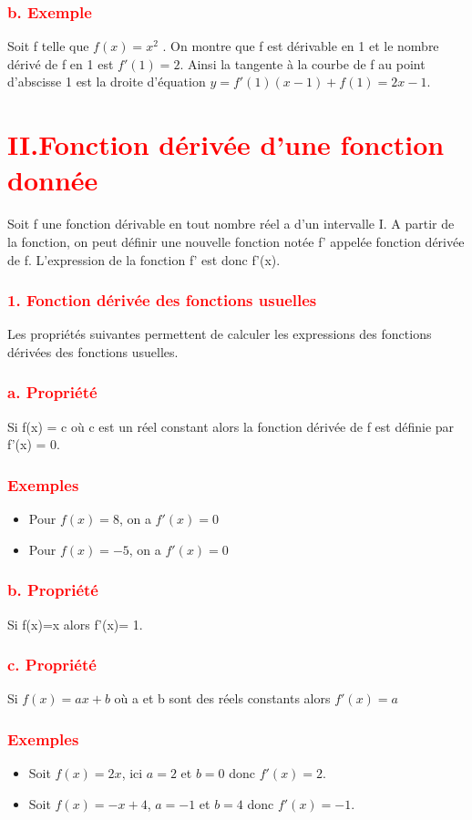 \documentclass[12pt]{article}
\begin{document}
\subsubsection*{\textcolor{red}{b. Exemple}}
Soit f telle que $f(x)= x^{2}$ . On montre que f est dérivable en 1 et le nombre dérivé de f en 1 est
$f'(1)=2$. Ainsi la tangente à la courbe de f au point d’abscisse 1 est la droite d’équation $y =f'(1)(x-1)+f(1) = 2x-1.$
\section*{\textcolor{red}{II.Fonction dérivée d’une fonction donnée}}
Soit f une fonction dérivable en tout nombre réel a d’un intervalle I. A partir de la fonction, on peut définir une nouvelle fonction notée f' appelée fonction dérivée de f. L’expression de la fonction f' est donc f'(x).
\subsubsection*{\textcolor{red}{1. Fonction dérivée des fonctions usuelles}}
Les propriétés suivantes permettent de calculer les expressions des fonctions dérivées des
fonctions usuelles.
\subsubsection*{\textcolor{red}{a. Propriété}}
Si f(x) = c où c est un réel constant alors la fonction dérivée de f est définie par f'(x) = 0.
\subsubsection*{\textcolor{red}{Exemples}}
\begin{itemize}
\item Pour $f(x) = 8$, on a $f'(x) = 0$
\item Pour $f(x)=-5$, on a $f'(x) = 0$
\end{itemize}
\subsubsection*{\textcolor{red}{b. Propriété}}
Si f(x)=x alors f'(x)= 1.
\subsubsection*{\textcolor{red}{c. Propriété}}
Si $f(x) = ax+b$ où a et b sont des réels constants alors $f'(x)=a$
\subsubsection*{\textcolor{red}{Exemples}}
\begin{itemize}
\item Soit $f(x)=2x$, ici $a=2$ et $b=0$ donc $f'(x)=2$.
\item Soit $f(x)=-x+4$, $a=-1$ et $b=4$ donc $f'(x) = -1$.
\end{itemize}
\end{document}
